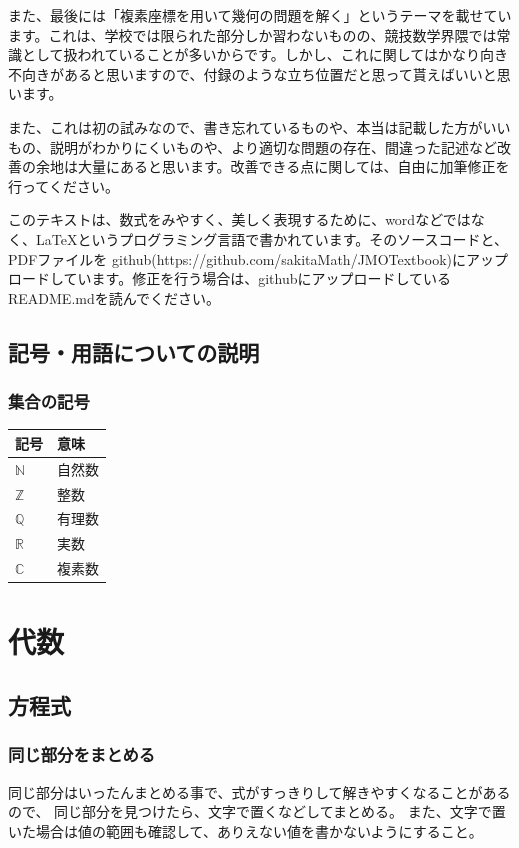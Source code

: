 \documentclass[uplatex,fleqn]{jsbook}
\begin{document}
また、最後には「複素座標を用いて幾何の問題を解く」というテーマを載せています。これは、学校では限られた部分しか習わないものの、競技数学界隈では常識として扱われていることが多いからです。しかし、これに関してはかなり向き不向きがあると思いますので、付録のような立ち位置だと思って貰えばいいと思います。

また、これは初の試みなので、書き忘れているものや、本当は記載した方がいいもの、説明がわかりにくいものや、より適切な問題の存在、間違った記述など改善の余地は大量にあると思います。改善できる点に関しては、自由に加筆修正を行ってください。

このテキストは、数式をみやすく、美しく表現するために、wordなどではなく、\LaTeX というプログラミング言語で書かれています。そのソースコードと、PDFファイルを
github(https://github.com/sakitaMath/JMOTextbook)にアップロードしています。修正を行う場合は、githubにアップロードしているREADME.mdを読んでください。

\section{記号・用語についての説明}
\subsection{集合の記号}
\begin{table}[h]
    \begin{tabular}{l|l}
        記号 & 意味\\\hline\hline
        $\mathbb{N}$ & 自然数\\
        $\mathbb{Z}$ & 整数\\
        $\mathbb{Q}$ & 有理数\\
        $\mathbb{R}$ & 実数\\
        $\mathbb{C}$ & 複素数\\\hline
    \end{tabular}
\end{table}

\chapter{代数}
\section{方程式}
\subsection{同じ部分をまとめる}
同じ部分はいったんまとめる事で、式がすっきりして解きやすくなることがあるので、
同じ部分を見つけたら、文字で置くなどしてまとめる。
また、文字で置いた場合は値の範囲も確認して、ありえない値を書かないようにすること。
\end{document}
